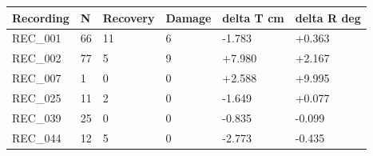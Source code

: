 \begin{tabular}{llllll}
\hline
Recording & N & Recovery & Damage & delta T cm & delta R deg \\
\hline
REC\_001 & 66 & 11 & 6 & -1.783 & +0.363 \\
REC\_002 & 77 & 5 & 9 & +7.980 & +2.167 \\
REC\_007 & 1 & 0 & 0 & +2.588 & +9.995 \\
REC\_025 & 11 & 2 & 0 & -1.649 & +0.077 \\
REC\_039 & 25 & 0 & 0 & -0.835 & -0.099 \\
REC\_044 & 12 & 5 & 0 & -2.773 & -0.435 \\
\hline
\end{tabular}
